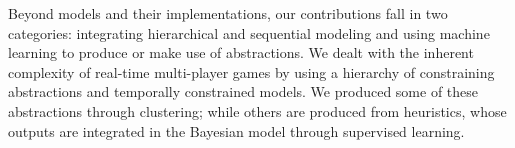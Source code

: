 Beyond models and their implementations, our contributions fall in two categories: integrating hierarchical and sequential modeling and using machine learning to produce or make use of abstractions. We dealt with the inherent complexity of real-time multi-player games by using a hierarchy of constraining abstractions and temporally constrained models. We produced some of these abstractions through clustering; while others are produced from heuristics, whose outputs are integrated in the Bayesian model through supervised learning.

